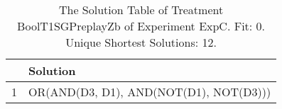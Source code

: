 \begin{table}[ht]
\centering
\begin{tabular}{rp{9cm}}
  \hline
 & Solution \\ 
  \hline
1 & OR(AND(D3, D1), AND(NOT(D1), NOT(D3))) \\ 
   \hline
\end{tabular}
\caption{The Solution Table of Treatment BoolT1SGPreplayZb of Experiment ExpC. Fit: 0. Unique Shortest Solutions: 12.} 
\end{table}
